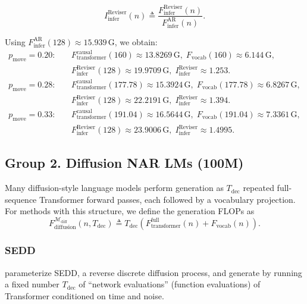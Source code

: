 \documentclass[11pt]{article}
\newcommand{\G}{\mathrm{G}} %
\begin{document}
\[
I_{\text{infer}}^{\text{Reviser}}(n)
\triangleq
\frac{F_{\text{infer}}^{\text{Reviser}}(n)}{F_{\text{infer}}^{\text{AR}}(n)}.
\]

Using $F_{\text{infer}}^{\text{AR}}(128)\approx \num{15.939}\,\G$, we obtain:
\[
\begin{aligned}
p_{\text{move}}=0.20:\quad
&F_{\text{transformer}}^{\text{causal}}(160)\approx \num{13.8269}\,\G,\;
F_{\text{vocab}}(160)\approx \num{6.144}\,\G,\\
&F_{\text{infer}}^{\text{Reviser}}(128)\approx \num{19.9709}\,\G,\;
I_{\text{infer}}^{\text{Reviser}}\approx \num{1.253}.\\[0.25em]
p_{\text{move}}=0.28:\quad
&F_{\text{transformer}}^{\text{causal}}(177.78)\approx \num{15.3924}\,\G,\;
F_{\text{vocab}}(177.78)\approx \num{6.8267}\,\G,\\
&F_{\text{infer}}^{\text{Reviser}}(128)\approx \num{22.2191}\,\G,\;
I_{\text{infer}}^{\text{Reviser}}\approx \num{1.394}.\\[0.25em]
p_{\text{move}}=0.33:\quad
&F_{\text{transformer}}^{\text{causal}}(191.04)\approx \num{16.5644}\,\G,\;
F_{\text{vocab}}(191.04)\approx \num{7.3361}\,\G,\\
&F_{\text{infer}}^{\text{Reviser}}(128)\approx \num{23.9006}\,\G,\;
I_{\text{infer}}^{\text{Reviser}}\approx \num{1.4995}.
\end{aligned}
\]

\subsection{Group 2. Diffusion NAR LMs (100M)}

Many diffusion-style language models perform generation as $T_{\text{dec}}$ repeated full-sequence Transformer forward passes, each followed by a vocabulary projection. For methods with this structure, we define the generation FLOPs as
\[
F_\text{diffusion}^{\mathcal{M}_{\text{diff}}}(n,T_{\text{dec}})
\triangleq
T_{\text{dec}}\left(F_\text{transformer}^\text{full}(n) + F_\text{vocab}(n)\right).
\]

\subsubsection{SEDD}
\label{app:sedd_100m}

\citet{lou2024sedd} parameterize SEDD, a reverse discrete diffusion process, and generate by running a fixed number
$T_{\text{dec}}$ of ``network evaluations'' (function evaluations) of Transformer conditioned on time and noise.
\end{document}
